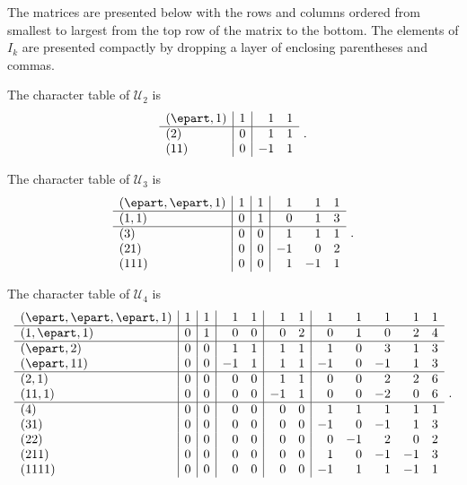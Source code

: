 \begin{example} \label{Ex:charactertable}
\label{ex:UBP2chartable}
The matrices are presented below with the rows and columns ordered from
smallest to largest from the top row of the matrix to the bottom.  The elements of
$I_k$ are presented compactly by dropping a layer of enclosing parentheses and commas.

The character table of $\mathcal{U}_2$ is
$$
\begin{array}{l|r|rr}
(\epart,1) & 1 & 1 & 1\\
\hline
(2) & 0 & 1 & 1\\
(11) & 0 & -1 & 1
\end{array}~.
$$

\label{ex:UBP3chartable}
The character table
of $\mathcal{U}_3$ is
$$
\begin{array}{l|r|r|rrr}
(\epart, \epart, 1) & 1 & 1 & 1 & 1 & 1\\
\hline
(1, 1) & 0 & 1 & 0 & 1 & 3\\
\hline
(3) & 0 & 0 & 1 & 1 & 1\\
(21) & 0 & 0 & -1 & 0 & 2\\
(111) & 0 & 0 & 1 & -1 & 1
\end{array}~.
$$

\label{ex:UBP4chartable}
The character table
of $\mathcal{U}_4$ is
$$
\begin{array}{l|r|r|rr|rr|rrrrr}
(\epart, \epart, \epart, 1) & 1 & 1 & 1 & 1 & 1 & 1 & 1 & 1 & 1 & 1 & 1\\
\hline
(1, \epart, 1) &0 & 1 & 0 & 0 & 0 & 2 & 0 & 1 & 0 & 2 & 4\\
\hline
(\epart, 2) &0 & 0 & 1 & 1 & 1 & 1 & 1 & 0 & 3 & 1 & 3\\
(\epart, 11) &0 & 0 & -1 & 1 & 1 & 1 & -1 & 0 & -1 & 1 & 3\\
\hline
(2, 1) &0 & 0 & 0 & 0 & 1 & 1 & 0 & 0 & 2 & 2 & 6\\
(11, 1) &0 & 0 & 0 & 0 & -1 & 1 & 0 & 0 & -2 & 0 & 6\\
\hline
(4) &0 & 0 & 0 & 0 & 0 & 0 & 1 & 1 & 1 & 1 & 1\\
(31) &0 & 0 & 0 & 0 & 0 & 0 & -1 & 0 & -1 & 1 & 3\\
(22) &0 & 0 & 0 & 0 & 0 & 0 & 0 & -1 & 2 & 0 & 2\\
(211) &0 & 0 & 0 & 0 & 0 & 0 & 1 & 0 & -1 & -1 & 3\\
(1111) &0 & 0 & 0 & 0 & 0 & 0 & -1 & 1 & 1 & -1 & 1
\end{array}~.
$$
\end{example}

